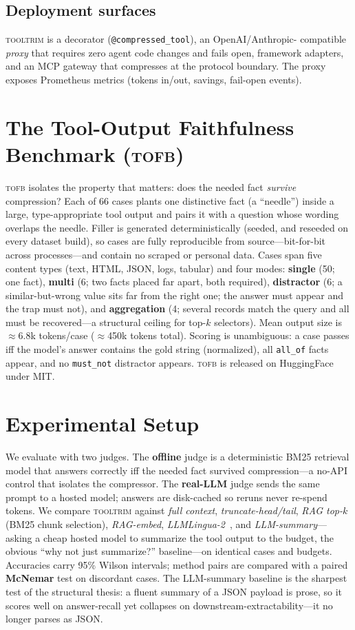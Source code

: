 \documentclass[11pt]{article}
\newcommand{\tooltrim}{\textsc{tooltrim}}
\newcommand{\tofb}{\textsc{tofb}}
\begin{document}
\subsection{Deployment surfaces}
\tooltrim{} is a decorator (\texttt{@compressed\_tool}), an OpenAI/Anthropic-
compatible \emph{proxy} that requires zero agent code changes and fails open,
framework adapters, and an MCP gateway that compresses at the protocol boundary.
The proxy exposes Prometheus metrics (tokens in/out, savings, fail-open events).

\section{The Tool-Output Faithfulness Benchmark (\tofb)}
\tofb{} isolates the property that matters: does the needed fact \emph{survive}
compression? Each of 66 cases plants one distinctive fact (a ``needle'') inside a
large, type-appropriate tool output and pairs it with a question whose wording
overlaps the needle. Filler is generated deterministically (seeded, and reseeded
on every dataset build), so cases are fully reproducible from source---bit-for-bit
across processes---and contain no scraped or personal data. Cases span five content
types (text, HTML, JSON, logs, tabular) and four modes: \textbf{single} (50; one
fact), \textbf{multi} (6; two facts placed far apart, both required),
\textbf{distractor} (6; a similar-but-wrong value sits far from the right one; the
answer must appear and the trap must not), and \textbf{aggregation} (4; several
records match the query and all must be recovered---a structural ceiling for
top-$k$ selectors). Mean output size is $\approx$6.8k tokens/case ($\approx$450k
tokens total). Scoring is
unambiguous: a case passes iff the model's answer contains the gold string
(normalized), all \texttt{all\_of} facts appear, and no \texttt{must\_not}
distractor appears. \tofb{} is released on HuggingFace under MIT.

\section{Experimental Setup}
We evaluate with two judges. The \textbf{offline} judge is a deterministic BM25
retrieval model that answers correctly iff the needed fact survived
compression---a no-API control that isolates the compressor. The
\textbf{real-LLM} judge sends the same prompt to a hosted model; answers are
disk-cached so reruns never re-spend tokens. We compare \tooltrim{} against
\emph{full context}, \emph{truncate-head/tail}, \emph{RAG top-$k$} (BM25 chunk
selection), \emph{RAG-embed}, \emph{LLMLingua-2}~\cite{pan2024llmlingua2}, and
\emph{LLM-summary}---asking a cheap hosted model to summarize the tool output to
the budget, the obvious ``why not just summarize?'' baseline---on identical cases
and budgets. Accuracies carry 95\% Wilson intervals; method pairs are compared
with a paired \textbf{McNemar} test on discordant cases. The LLM-summary baseline
is the sharpest test of the structural thesis: a fluent summary of a JSON payload
is prose, so it scores well on answer-recall yet collapses on
downstream-extractability---it no longer parses as JSON.
\end{document}
